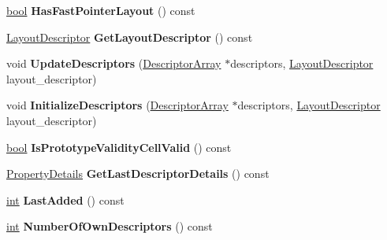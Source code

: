 \begin{DoxyCompactItemize}
\item 
\mbox{\label{classv8_1_1internal_1_1Map_aa2685615d7872ec943c57e7d8c823928}} 
\mbox{\hyperlink{classbool}{bool}} {\bfseries Has\+Fast\+Pointer\+Layout} () const
\item 
\mbox{\label{classv8_1_1internal_1_1Map_a94f07371200197b848fc72c4fcf1909d}} 
\mbox{\hyperlink{classv8_1_1internal_1_1LayoutDescriptor}{Layout\+Descriptor}} {\bfseries Get\+Layout\+Descriptor} () const
\item 
\mbox{\label{classv8_1_1internal_1_1Map_aef2cd610f8344213bbfe88ee2541eb59}} 
void {\bfseries Update\+Descriptors} (\mbox{\hyperlink{classv8_1_1internal_1_1DescriptorArray}{Descriptor\+Array}} $\ast$descriptors, \mbox{\hyperlink{classv8_1_1internal_1_1LayoutDescriptor}{Layout\+Descriptor}} layout\+\_\+descriptor)
\item 
\mbox{\label{classv8_1_1internal_1_1Map_a5f05086c6c54321969ea489b46d0878c}} 
void {\bfseries Initialize\+Descriptors} (\mbox{\hyperlink{classv8_1_1internal_1_1DescriptorArray}{Descriptor\+Array}} $\ast$descriptors, \mbox{\hyperlink{classv8_1_1internal_1_1LayoutDescriptor}{Layout\+Descriptor}} layout\+\_\+descriptor)
\item 
\mbox{\label{classv8_1_1internal_1_1Map_a0e3af4d7d3c7e4fde033d1b02f139003}} 
\mbox{\hyperlink{classbool}{bool}} {\bfseries Is\+Prototype\+Validity\+Cell\+Valid} () const
\item 
\mbox{\label{classv8_1_1internal_1_1Map_a1ea0ed2769b5ebbfef4c3931ddd17b07}} 
\mbox{\hyperlink{classv8_1_1internal_1_1PropertyDetails}{Property\+Details}} {\bfseries Get\+Last\+Descriptor\+Details} () const
\item 
\mbox{\label{classv8_1_1internal_1_1Map_a9e61c022f65f5edf49e5810e6ed42ed2}} 
\mbox{\hyperlink{classint}{int}} {\bfseries Last\+Added} () const
\item 
\mbox{\label{classv8_1_1internal_1_1Map_ad076564048dcb70a0ae6d733c4f5bc42}} 
\mbox{\hyperlink{classint}{int}} {\bfseries Number\+Of\+Own\+Descriptors} () const

\end{DoxyCompactItemize}
